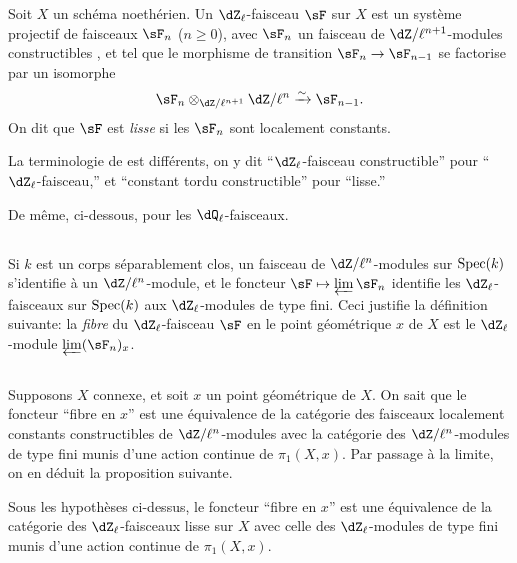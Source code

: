 \begin{definition_}\label{II:2-1}
Soit $X$ un schéma noethérien. Un $\dZ_\ell$-faisceau $\sF$ sur $X$ est un 
système projectif de faisceaux $\sF_n$ ($n\geqslant 0$), avec $\sF_n$ un 
faisceau de $\dZ/\ell^{n+1}$-modules constructibles \cite[IX.2]{sga4}, et tel que 
le morphisme de transition $\sF_n\to\sF_{n-1}$ se factorise par un isomorphe 
\[
  \sF_n\otimes_{\dZ/\ell^{n+1}} \dZ/\ell^n \iso \sF_{n-1}\text{.}
\]
On dit que $\sF$ est \emph{lisse} si les $\sF_n$ sont localement constants. 
\end{definition_}

La terminologie de \cite{sga5} est différents, on y dit ``$\dZ_\ell$-faisceau 
constructible'' pour ``$\dZ_\ell$-faisceau,'' et ``constant tordu 
constructible'' pour ``lisse.'' 

De même, ci-dessous, pour les $\dQ_\ell$-faisceaux. 





\subsection{}\label{II:2-2}

Si $k$ est un corps séparablement clos, un faisceau de $\dZ/\ell^n$-modules 
sur $\operatorname{Spec}(k)$ s'identifie à un $\dZ/\ell^n$-module, et le foncteur 
$\sF\mapsto \varprojlim \sF_n$ identifie les $\dZ_\ell$-faisceaux sur 
$\operatorname{Spec}(k)$ aux $\dZ_\ell$-modules de type fini. Ceci justifie la définition 
suivante: la \emph{fibre} du $\dZ_\ell$-faisceau $\sF$ en le point 
géométrique $x$ de $X$ est le $\dZ_\ell$-module $\varprojlim (\sF_n)_x$. 





\subsection{}\label{II:2-3}

Supposons $X$ connexe, et soit $x$ un point géométrique de $X$. On sait que 
le foncteur ``fibre en $x$'' est une équivalence de la catégorie des 
faisceaux localement constants constructibles de $\dZ/\ell^n$-modules avec la 
catégorie des $\dZ/\ell^n$-modules de type fini munis d'une action continue 
de $\pi_1(X,x)$. Par passage à la limite, on en déduit la proposition 
suivante. 





\begin{proposition_}\label{II:2-4}
Sous les hypothèses ci-dessus, le foncteur ``fibre en $x$'' est une 
équivalence de la catégorie des $\dZ_\ell$-faisceaux lisse sur $X$ avec 
celle des $\dZ_\ell$-modules de type fini munis d'une action continue de 
$\pi_1(X,x)$. 
\end{proposition_}





